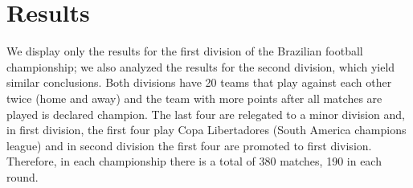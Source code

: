 \documentclass[journal,article,accept,moreauthors,pdftex,12pt,a4paper]{mdpi}
\begin{document}
	
	
	
	\section{Results}
	\label{sec::results}
	
	We display only the results for the first division of the Brazilian football championship;
	we also analyzed the results for the second division, which yield similar conclusions.
	Both divisions have 20 teams that play against each other twice (home and away) and the team with more points after all matches are played is declared champion.
	The last four are relegated to a minor division and, in first division, the first four play Copa Libertadores (South America champions league) and in second division the first four are promoted to first division.
	Therefore, in each championship there is a total of 380 matches, 190 in each round.
	
	
	
\end{document}
